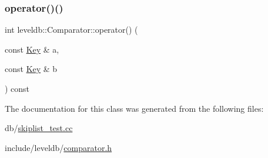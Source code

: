\subsubsection{\texorpdfstring{operator()()}{operator()()}}
{\footnotesize\ttfamily int leveldb\+::\+Comparator\+::operator() (\begin{DoxyParamCaption}\item[{const \mbox{\hyperlink{namespaceleveldb_a7e9a9725b13fa0bd922d885280dfab95}{Key}} \&}]{a,  }\item[{const \mbox{\hyperlink{namespaceleveldb_a7e9a9725b13fa0bd922d885280dfab95}{Key}} \&}]{b }\end{DoxyParamCaption}) const\hspace{0.3cm}{\ttfamily [inline]}}



The documentation for this class was generated from the following files\+:\begin{DoxyCompactItemize}
\item 
db/\mbox{\hyperlink{skiplist__test_8cc}{skiplist\+\_\+test.\+cc}}\item 
include/leveldb/\mbox{\hyperlink{comparator_8h}{comparator.\+h}}\end{DoxyCompactItemize}
